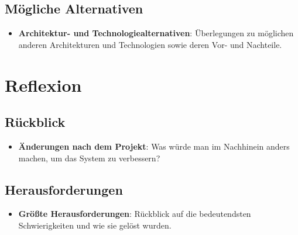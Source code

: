 \documentclass[
]{article}
\begin{document}
\subsection{Mögliche Alternativen}
\begin{itemize}
    \item \textbf{Architektur- und Technologiealternativen}: Überlegungen zu möglichen anderen Architekturen und Technologien sowie deren Vor- und Nachteile.
\end{itemize}

\section{Reflexion}

\subsection{Rückblick}
\begin{itemize}
    \item \textbf{Änderungen nach dem Projekt}: Was würde man im Nachhinein anders machen, um das System zu verbessern?
\end{itemize}

\subsection{Herausforderungen}
\begin{itemize}
    \item \textbf{Größte Herausforderungen}: Rückblick auf die bedeutendsten Schwierigkeiten und wie sie gelöst wurden.
\end{itemize}
\end{document}
